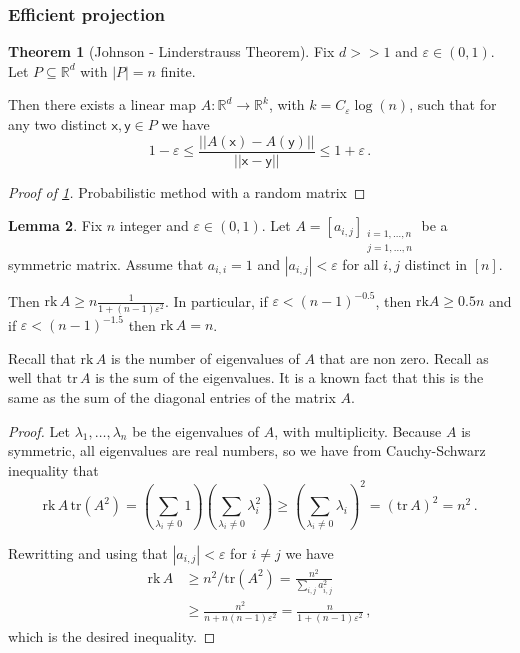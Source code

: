 \documentclass[12pt]{amsart}
\theoremstyle{definition}
\newtheorem{thm}{Theorem}[section]
\newtheorem{lm}[thm]{Lemma}
\newcommand{\R}{\mathbb{R}}
\newcommand{\vx}{\mathsf{x}}
\newcommand{\vy}{\mathsf{y}}
\newcommand{\rk}{\mathrm{rk}}
\newcommand{\tr}{\mathrm{tr}}
\begin{document}
\subsubsection*{Efficient projection}




\begin{thm}[Johnson - Linderstrauss Theorem]\label{thm:JL}
Fix $d >> 1$ and $\varepsilon \in (0, 1)$.
Let $P \subseteq \R^d$ with $|P| = n$ finite.

Then there exists a linear map $A:\R^d \to \R^k$, with $k = C_{\varepsilon} \log (n)$, such that for any two distinct $\vx, \vy \in P$ we have
$$ 1 - \varepsilon \leq \frac{||A(\vx) - A(\vy)||}{||\vx - \vy||} \leq 1 + \varepsilon \, . $$
\end{thm}

\begin{proof}[Proof of \cref{thm:JL}]%
Probabilistic method with a random matrix
\end{proof}

\begin{lm}\label{lm:JL_1}
Fix $n$ integer and $\varepsilon \in (0, 1)$.
Let $A = [a_{i, j}]_{\substack{i = 1, \ldots , n \\ j = 1, \ldots , n}}$ be a symmetric matrix.
Assume that $a_{i, i} = 1$ and $|a_{i, j}| < \varepsilon $ for all $i, j$ distinct in $[n]$.

Then $\rk \,A \geq n \frac{1}{1 + (n-1)\varepsilon^2}$.
In particular, if $\varepsilon < (n-1)^{-0.5}$, then $\rk A \geq 0.5 n$ and if $\varepsilon < (n-1)^{-1.5}$ then $\rk \,A = n$.
\end{lm}

Recall that $\rk \, A$ is the number of eigenvalues of $A$ that are non zero.
Recall as well that $\tr \, A$ is the sum of the eigenvalues.
It is a known fact that this is the same as the sum of the diagonal entries of the matrix $A$.

\begin{proof}
Let $\lambda_1, \ldots, \lambda_n$ be the eigenvalues of $A$, with multiplicity.
Because $A$ is symmetric, all eigenvalues are real numbers, so we have from Cauchy-Schwarz inequality that
$$\rk \, A \,  \tr (A^2)= \left(\sum_{\lambda_i \neq 0} 1 \right)\left( \sum_{\lambda_i \neq 0} \lambda_i^2\right) \geq \left( \sum_{\lambda_i \neq 0} \lambda_i \right)^2 = (\tr\,  A)^2 = n^2 \, . $$

Rewritting and using that $|a_{i, j}| < \varepsilon$ for $i\neq j$ we have 
\begin{align*}
\rk \, A &\geq n^2/\tr (A^2) = \frac{n^2}{\sum_{i, j} a_{i, j}^2} \\
&\geq \frac{n^2}{n + n(n-1)\varepsilon^2} = \frac{n}{1 + (n-1)\varepsilon^2}\, ,
\end{align*}
which is the desired inequality.
\end{proof}
\end{document}
